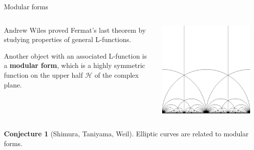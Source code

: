\documentclass[10pt]{beamer}
\theoremstyle{definition}
\newtheorem{conjecture}{Conjecture}
\begin{document}
\begin{frame}[t]{Modular forms}

\begin{columns}[T]

\begin{column}{0.7\textwidth}
Andrew Wiles proved Fermat's last theorem by studying properties of general L-functions.

\vspace{0.5cm} Another object with an associated L-function is a \textbf{modular form}, which is a highly symmetric function on the upper half $ \mathcal{H} $ of the complex plane.
\end{column}

\begin{column}{0.2\textwidth}
\hspace{-1cm}
\includegraphics[width=1.2\textwidth]{modularform.jpg}
\end{column}

\end{columns}

\vspace{0.5cm}

\begin{conjecture}[Shimura, Taniyama, Weil]
Elliptic curves are related to modular forms.
\end{conjecture}


\end{frame}
\end{document}
